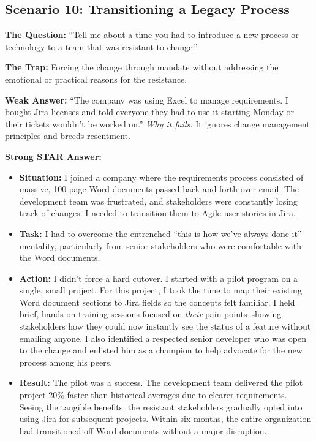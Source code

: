\documentclass[
  11pt,
  openany,
  oneside]{book}
\providecommand{\tightlist}{%
  \setlength{\itemsep}{0pt}\setlength{\parskip}{0pt}}
\begin{document}
\subsection{Scenario 10: Transitioning a Legacy
Process}\label{scenario-10-transitioning-a-legacy-process}

\textbf{The Question:} ``Tell me about a time you had to introduce a new
process or technology to a team that was resistant to change.''

\textbf{The Trap:} Forcing the change through mandate without addressing
the emotional or practical reasons for the resistance.

\textbf{Weak Answer:} ``The company was using Excel to manage
requirements. I bought Jira licenses and told everyone they had to use
it starting Monday or their tickets wouldn't be worked on.'' \emph{Why
it fails:} It ignores change management principles and breeds
resentment.

\textbf{Strong STAR Answer:}

\begin{itemize}
\tightlist
\item
  \textbf{Situation:} I joined a company where the requirements process
  consisted of massive, 100-page Word documents passed back and forth
  over email. The development team was frustrated, and stakeholders were
  constantly losing track of changes. I needed to transition them to
  Agile user stories in Jira.
\item
  \textbf{Task:} I had to overcome the entrenched ``this is how we've
  always done it'' mentality, particularly from senior stakeholders who
  were comfortable with the Word documents.
\item
  \textbf{Action:} I didn't force a hard cutover. I started with a pilot
  program on a single, small project. For this project, I took the time
  to map their existing Word document sections to Jira fields so the
  concepts felt familiar. I held brief, hands-on training sessions
  focused on \emph{their} pain points--showing stakeholders how they
  could now instantly see the status of a feature without emailing
  anyone. I also identified a respected senior developer who was open to
  the change and enlisted him as a champion to help advocate for the new
  process among his peers.
\item
  \textbf{Result:} The pilot was a success. The development team
  delivered the pilot project 20\% faster than historical averages due
  to clearer requirements. Seeing the tangible benefits, the resistant
  stakeholders gradually opted into using Jira for subsequent projects.
  Within six months, the entire organization had transitioned off Word
  documents without a major disruption.
\end{itemize}
\end{document}
